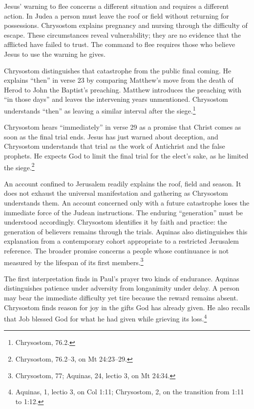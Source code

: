 Jesus' warning to flee concerns a different situation and requires a
different action. In Judea a person must leave the roof or field without
returning for possessions. Chrysostom explains pregnancy and nursing through
the difficulty of escape. These circumstances reveal vulnerability; they
are no evidence that the afflicted have failed to trust. The command to
flee requires those who believe Jesus to use the warning he gives.

Chrysostom distinguishes that catastrophe from the public final coming.
He explains ``then'' in verse 23 by comparing Matthew's move from the death
of Herod to John the Baptist's preaching. Matthew introduces the preaching
with ``in those days'' and leaves the intervening years unmentioned.
Chrysostom understands ``then'' as leaving a similar interval after the
siege.\footnote{Chrysostom,
 76.2.}

Chrysostom hears ``immediately'' in verse 29 as a promise that Christ comes
as soon as the final trial ends. Jesus has just warned about deception,
and Chrysostom understands that trial as the work of Antichrist and the
false prophets. He expects God to limit the final trial for the elect's
sake, as he limited the siege.\footnote{Chrysostom,  76.2--3,
on Mt 24:23--29.}

An account confined to Jerusalem readily explains the roof, field and
season. It does not exhaust the universal manifestation and gathering as
Chrysostom understands them. An account concerned only with a future
catastrophe loses the immediate force of the Judean instructions.
The enduring ``generation'' must be understood accordingly. Chrysostom
identifies it by faith and practice: the generation of believers remains
through the trials. Aquinas also distinguishes this explanation from a
contemporary cohort appropriate to a restricted Jerusalem reference.
The broader promise concerns a people whose continuance is not measured
by the lifespan of its first members.\footnote{Chrysostom,
 77; Aquinas,  24,
lectio 3, on Mt 24:34.}

The first interpretation finds in Paul's prayer two kinds of endurance.
Aquinas distinguishes patience under adversity from longanimity under
delay. A person may bear the immediate difficulty yet tire because the
reward remains absent. Chrysostom finds reason for joy in the gifts God
has already given. He also recalls that Job blessed God for what he had
given while grieving its loss.\footnote{Aquinas, 
1, lectio 3, on Col 1:11; Chrysostom,  2,
on the transition from 1:11 to 1:12.}

